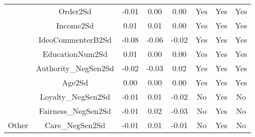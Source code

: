\begin{table}[!h]
\begin{tabular}[t]{lccccccc}
 & Order2Sd & -0.01 & 0.00 & 0.00 & Yes & Yes & Yes\\
\cmidrule{2-8}
 & Income2Sd & 0.01 & 0.01 & 0.00 & Yes & Yes & Yes\\
\cmidrule{2-8}
 & IdeoCommenterB2Sd & -0.08 & -0.06 & -0.02 & Yes & Yes & Yes\\
\cmidrule{2-8}
 & EducationNum2Sd & 0.01 & 0.00 & 0.00 & Yes & Yes & Yes\\
\cmidrule{2-8}
 & Authority_NegSen2Sd & -0.02 & -0.03 & 0.02 & Yes & Yes & Yes\\
\cmidrule{2-8}
 & Age2Sd & 0.00 & 0.00 & 0.00 & Yes & Yes & Yes\\
\cmidrule{2-8}
 & Loyalty_NegSen2Sd & -0.01 & 0.01 & -0.02 & No & Yes & No\\
\cmidrule{2-8}
 & Fairness_NegSen2Sd & -0.01 & 0.02 & -0.03 & No & Yes & No\\
\cmidrule{2-8}
\multirow{-11}{*}{\raggedright\arraybackslash Other} & Care_NegSen2Sd & -0.01 & 0.01 & -0.01 & No & Yes & No\\
\bottomrule
\end{tabular}
\end{table}
